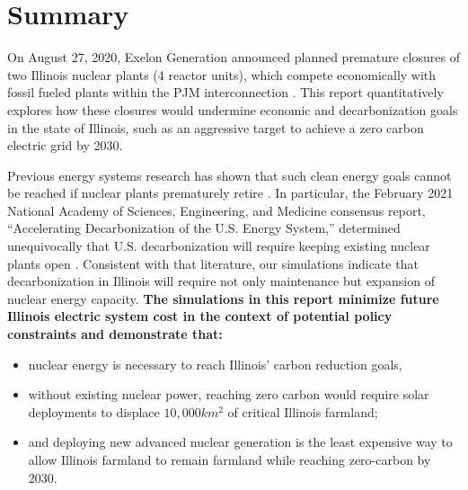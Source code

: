 \section{Summary}
On August 27, 2020, Exelon Generation announced planned premature closures of 
two Illinois nuclear plants (4 reactor units), which compete economically with 
fossil fueled plants within the \gls{PJM} interconnection \cite{larson_exelon_2020}. 
This report quantitatively explores how these closures would undermine economic 
and decarbonization goals in the state of Illinois, such as an aggressive 
target to achieve a zero carbon electric grid by 2030.

Previous energy systems research has shown that such clean energy goals cannot 
be reached if nuclear plants prematurely retire 
\cite{national_academies_of_sciences_engineering_and_medicine_2021_accelerating_2021,larson_net-zero_2020,davis_net-zero_2018}.  
In particular, the February 2021 National Academy of Sciences, Engineering, and 
Medicine consensus report, ``Accelerating Decarbonization of the U.S. Energy 
System,'' determined unequivocally that U.S. decarbonization will require keeping 
existing nuclear plants open 
\cite{national_academies_of_sciences_engineering_and_medicine_2021_accelerating_2021}. 
Consistent with that literature, our simulations indicate that decarbonization 
in Illinois will require not only maintenance but expansion of nuclear energy capacity. 
\textbf{The simulations in this report minimize future Illinois electric system 
cost in the context of potential policy constraints and demonstrate that:}

\begin{itemize}
        \item nuclear energy is necessary to reach Illinois' carbon reduction 
                goals,
        \item without existing nuclear power, reaching zero carbon would 
                require solar deployments to displace $10,000km^2$ of critical 
                Illinois 
                farmland;
        \item and deploying new advanced nuclear generation is the least expensive way to 
                allow Illinois farmland to remain farmland while reaching 
                zero-carbon by 2030.
  \end{itemize}

